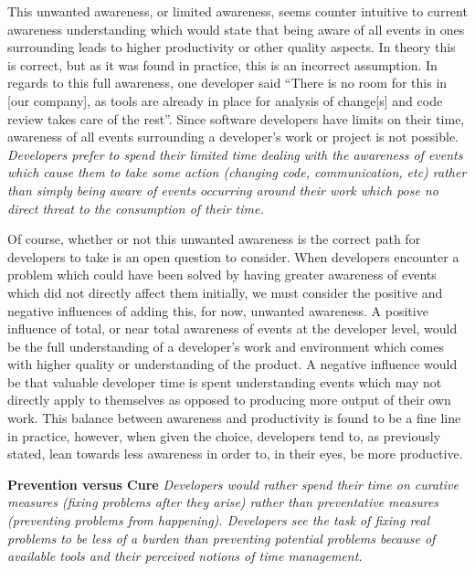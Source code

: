 \documentclass[conference]{IEEEtran}
\begin{document}
This unwanted awareness, or limited awareness, seems counter intuitive to current awareness understanding which would state that
being aware of all events in ones surrounding leads to higher productivity or other quality aspects. In theory this is correct,
but as it was found in practice, this is an incorrect assumption. 
In regards to this full awareness, one developer said ``There is no room for this in [our company], as tools are already in place for 
analysis of change[s] and code review takes care of the rest''. Since software developers have limits on their time, awareness of
all events surrounding a developer's work or project is not possible. \textit{Developers prefer to spend their limited time dealing with
the awareness of events which cause them to take some action (changing code, communication, etc) rather than simply being aware
of events occurring around their work which pose no direct threat to the consumption of their time.}

Of course, whether or not this unwanted awareness is the correct path for developers to take is an open question to consider. When
developers encounter a problem which could have been solved by having greater awareness of events which did not directly affect
them initially, we must consider the positive and negative influences of adding this, for now, unwanted awareness. A positive
influence of total, or near total
awareness of events at the developer level, would be the full understanding of a developer's work and environment which comes
with higher quality or understanding of the product. 
A negative influence would be that valuable developer time is spent understanding events which may not directly apply to themselves as opposed to 
producing more output of their own work. This balance between awareness and productivity is found to be a fine line in practice,
however, when given the choice, developers tend to, as previously stated, lean towards less awareness in order to, in their eyes,
be more productive.

\textbf{Prevention versus Cure}  \textit{Developers would rather spend their time on curative measures (fixing problems after they
arise) rather than preventative measures (preventing problems from happening). Developers see the task of fixing real problems
to be less of a burden than preventing potential problems because of available tools and their perceived notions of time management.}
\end{document}
